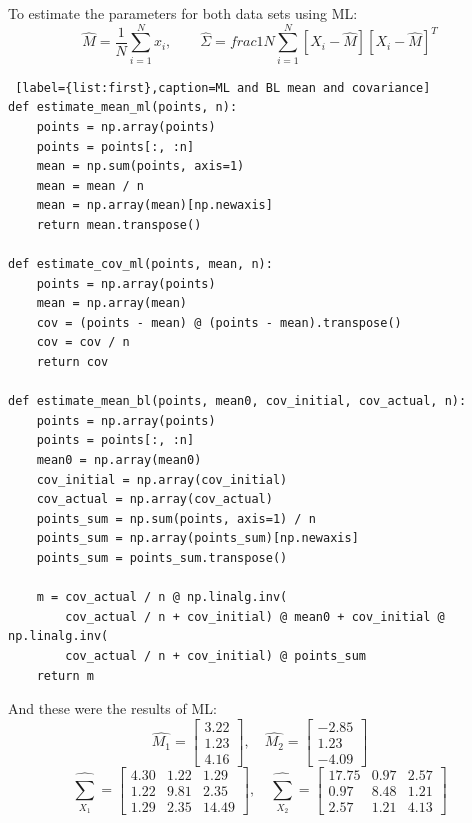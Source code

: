 \documentclass[11pt, oneside]{article}   	%
\begin{document}
To estimate the parameters for both data sets using ML:
$$ \hat{M}=\frac{1}{N} \sum_{i=1}^{N} x_i, \quad\quad \hat{\Sigma}=	 frac{1}{N} \sum_{i=1}^{N}[X_i-\hat{M}][X_i-\hat{M}]^T$$


\begin{lstlisting} [label={list:first},caption=ML and BL mean and covariance]
def estimate_mean_ml(points, n):
    points = np.array(points)
    points = points[:, :n]
    mean = np.sum(points, axis=1)
    mean = mean / n
    mean = np.array(mean)[np.newaxis]
    return mean.transpose()

def estimate_cov_ml(points, mean, n):
    points = np.array(points)
    mean = np.array(mean)
    cov = (points - mean) @ (points - mean).transpose()
    cov = cov / n
    return cov

def estimate_mean_bl(points, mean0, cov_initial, cov_actual, n):
    points = np.array(points)
    points = points[:, :n]
    mean0 = np.array(mean0)
    cov_initial = np.array(cov_initial)
    cov_actual = np.array(cov_actual)
    points_sum = np.sum(points, axis=1) / n
    points_sum = np.array(points_sum)[np.newaxis]
    points_sum = points_sum.transpose()

    m = cov_actual / n @ np.linalg.inv(
        cov_actual / n + cov_initial) @ mean0 + cov_initial @ np.linalg.inv(
        cov_actual / n + cov_initial) @ points_sum
    return m
\end{lstlisting}

And these were the results of ML:$$\hat{M_1} = \begin{bmatrix}
3.22 \\ 1.23 \\ 4.16 
\end{bmatrix},\quad \hat{M_2} = \begin{bmatrix}
-2.85 \\ 1.23 \\ -4.09 
\end{bmatrix}$$
$$\hat{\sum_{X_1}} = \begin{bmatrix}
4.30 & 1.22 & 1.29 \\
1.22 & 9.81 & 2.35 \\
1.29 & 2.35 & 14.49 
\end{bmatrix}, \quad \hat{\sum_{X_2}} = \begin{bmatrix}
17.75 & 0.97 & 2.57 \\
0.97 & 8.48 & 1.21 \\
2.57 & 1.21 & 4.13 
\end{bmatrix}$$\\
\end{document}
